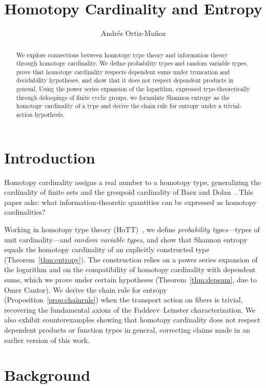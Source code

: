 \documentclass[12pt]{amsart}
\title{Homotopy Cardinality and Entropy}
\author{Andr\'es Ortiz-Mu\~noz}
\theoremstyle{plain}
\theoremstyle{definition}
\theoremstyle{remark}
\begin{document}
\begin{abstract}
We explore connections between homotopy type theory and information theory through homotopy cardinality. We define probability types and random variable types, prove that homotopy cardinality respects dependent sums under truncation and decidability hypotheses, and show that it does not respect dependent products in general. Using the power series expansion of the logarithm, expressed type-theoretically through deloopings of finite cyclic groups, we formulate Shannon entropy as the homotopy cardinality of a type and derive the chain rule for entropy under a trivial-action hypothesis.
\end{abstract}

\maketitle

\section{Introduction}

Homotopy cardinality assigns a real number to a homotopy type, generalizing the cardinality of finite sets and the groupoid cardinality of Baez and Dolan~\cite{baez2001finite}. This paper asks: what information-theoretic quantities can be expressed as homotopy cardinalities?

Working in homotopy type theory (HoTT)~\cite{hottbook}, we define \emph{probability types}---types of unit cardinality---and \emph{random variable types}, and show that Shannon entropy equals the homotopy cardinality of an explicitly constructed type (Theorem~\ref{thm:entropy}). The construction relies on a power series expansion of the logarithm and on the compatibility of homotopy cardinality with dependent sums, which we prove under certain hypotheses (Theorem~\ref{thm:depsum}, due to Omer Cantor). We derive the chain rule for entropy (Proposition~\ref{prop:chainrule}) when the transport action on fibers is trivial, recovering the fundamental axiom of the Faddeev--Leinster characterization. We also exhibit counterexamples showing that homotopy cardinality does not respect dependent products or function types in general, correcting claims made in an earlier version of this work.

\section{Background}\label{sec:background}
\end{document}
